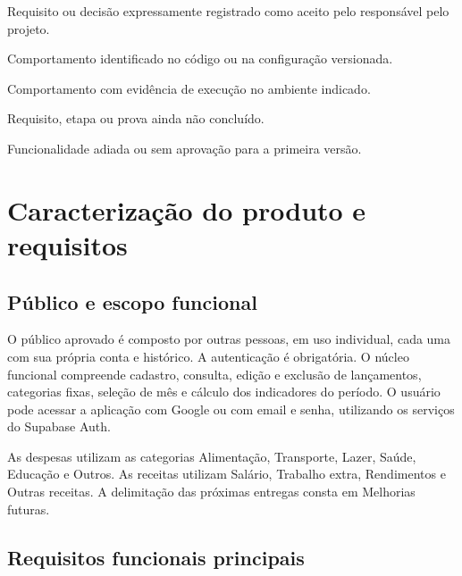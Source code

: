 \documentclass[
    12pt,
    oneside,
    a4paper,
    brazil
]{abntex2}
\begin{document}
\begin{description}[style=nextline]
\item[Aprovado] Requisito ou decisão expressamente registrado como aceito pelo responsável pelo projeto.
\item[Implementado] Comportamento identificado no código ou na configuração versionada.
\item[Validado] Comportamento com evidência de execução no ambiente indicado.
\item[Pendente] Requisito, etapa ou prova ainda não concluído.
\item[Fora do escopo atual] Funcionalidade adiada ou sem aprovação para a primeira versão.
\end{description}

\chapter{Caracterização do produto e requisitos}

\section{Público e escopo funcional}

O público aprovado é composto por outras pessoas, em uso individual, cada uma com sua própria conta e histórico. A autenticação é obrigatória. O núcleo funcional compreende cadastro, consulta, edição e exclusão de lançamentos, categorias fixas, seleção de mês e cálculo dos indicadores do período. O usuário pode acessar a aplicação com Google ou com email e senha, utilizando os serviços do Supabase Auth.

As despesas utilizam as categorias Alimentação, Transporte, Lazer, Saúde, Educação e Outros. As receitas utilizam Salário, Trabalho extra, Rendimentos e Outras receitas. A delimitação das próximas entregas consta em Melhorias futuras.

\section{Requisitos funcionais principais}
\end{document}

